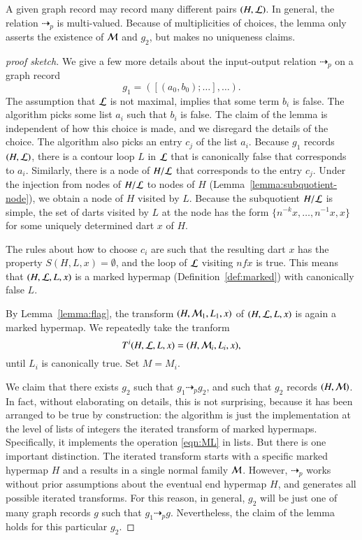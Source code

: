 \begin{remark}
  A given graph record may record many different pairs $(H,{\cal L})$.
  In general, the relation $\dashrightarrow_p$ is multi-valued.
  Because of multiplicities of choices, the lemma only asserts the
  existence of ${\cal M}$ and $g_2$, but makes no uniqueness claims.
\end{remark}

\begin{proof}[proof sketch]
We give a few more details about the input-output relation
$\dashrightarrow_p$ on a graph record 
\[
g_1 = ([(a_0,b_0);\ldots],\ldots).
\]
The assumption that ${\cal L}$ is not maximal, implies that some term
$b_i$ is false.  The algorithm picks some list $a_i$ such that $b_i$
is false.  The claim of the lemma is independent of how this choice is
made, and we disregard the details of the choice.  The algorithm also
picks an entry $c_j$ of the list $a_i$.  Because $g_1$ records
$(H,{\cal L})$, there is a contour loop $L$ in ${\cal L}$ that is
canonically false that corresponds to $a_i$.  Similarly, there is a
node of $H/{\cal L}$ that corresponds to the entry $c_j$.  Under the
injection from nodes of $H/{\cal L}$ to nodes of $H$
(Lemma~\ref{lemma:subquotient-node}), we obtain a node of $H$ visited
by $L$.  Because the subquotient $H/{\cal L}$ is simple, the set of
darts visited by $L$ at the node has the form $\{n^{-k}
x,\ldots,n^{-1}x,x\}$ for some uniquely determined dart $x$ of $H$.

The rules about how to choose $c_i$ are such that the resulting dart
$x$ has the property $S(H,L,x)=\emptyset$, and the loop of ${\cal L}$
visiting $n f x$ is true.  This means that $(H,{\cal L},L,x)$ is a
marked hypermap (Definition~\ref{def:marked}) with canonically false
$L$.

By Lemma~\ref{lemma:flag}, the transform $(H,{\cal M}_1,L_1,x)$ of
$(H,{\cal L},L,x)$ is again a marked hypermap.  We repeatedly take the
tranform
\[
T^i(H,{\cal L},L,x) = (H,{\cal M}_i,L_i,x),
\]
until $L_i$ is canonically true.  Set $M=M_i$.

We claim that there exists $g_2$ such that $g_1 \dashrightarrow_p
g_2$, and such that $g_2$ records $(H,{\cal M})$.  In fact, without
elaborating on details, this is not surprising, because it has been
arranged to be true by construction: the algorithm is just the
implementation at the level of lists of integers the iterated
transform of marked hypermaps.  Specifically, it implements the
operation \eqref{eqn:ML} in lists.  But there is one important
distinction.  The iterated transform starts with a specific marked
hypermap $H$ and a results in a single normal family ${\cal M}$.
However, $\dashrightarrow_p$ works without prior assumptions about the
eventual end hypermap $H$, and generates all possible iterated
transforms.  For this reason, in general, $g_2$ will be just one of
many graph records $g$ such that $g_1\dashrightarrow_p g$.  Nevertheless,
the claim of the lemma holds for this particular $g_2$.
\end{proof}

